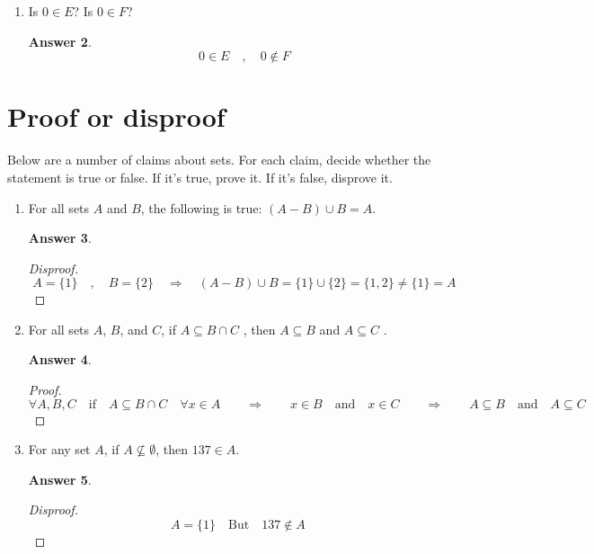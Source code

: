 \documentclass{article}
\renewcommand{\(}{\left(}
\renewcommand{\)}{\right)}
\theoremstyle{plain}
\theoremstyle{plain}
\theoremstyle{definition}
\newtheorem*{answer}{Answer}
\begin{document}
\begin{enumerate}[label*=\roman*.,ref=\roman*]
\begin{shaded}
\begin{answer}
$$  E - A =\{ x \in  \mathds{N} : x \geq 5 \} \cup \{0\}  $$
\end{answer}
\end{shaded}

\item Is $0 \in E$? Is $0 \in F$?

\begin{shaded}
\begin{answer}
$$ 0 \in E \quad , \quad 0\not \in F $$
\end{answer}
\end{shaded}

\end{enumerate}

\section{Proof or disproof}

Below are a number of claims about sets. For each claim, decide whether the statement is true or false. If it's true, prove it. If it's false, disprove it.
\begin{enumerate}[label*=\roman*.,ref=\roman*]
\item For all sets $A$ and $B$, the following is true: $ (A - B) \cup B = A. $
\begin{shaded}
\begin{answer}
\begin{proof}[Disproof]
  $$ A = \{1\} \quad , \quad B = \{2\} \quad \Rightarrow \quad (A - B) \cup B = \{1\}\cup \{2\} = \{ 1 ,2 \} \neq \{1\} = A $$
\end{proof}
\end{answer}
\end{shaded}

\item For all sets $A$, $B$, and $C$, if $ A \subseteq B \cap C$ , then $ A \subseteq B $ and $ A \subseteq C$ .
\begin{shaded}
\begin{answer}
\begin{proof}
  $$ \forall A , B , C \quad \text{if} \quad A \subseteq B \cap C \quad \forall x \in A \qquad \Rightarrow \qquad x \in B \quad \text{and} \quad x \in C \qquad \Rightarrow \qquad A \subseteq B \quad \text{and} \quad A \subseteq C$$
\end{proof}
\end{answer}
\end{shaded}

\item For any set $A$, if $ A \not \subseteq \emptyset $, then $137 \in A$.
\begin{shaded}
\begin{answer}
\begin{proof}[Disproof]
  $$ A = \{1\} \quad \text{But} \quad 137 \not \in A \quad $$
\end{proof}
\end{answer}
\end{shaded}


\end{enumerate}
\end{document}
